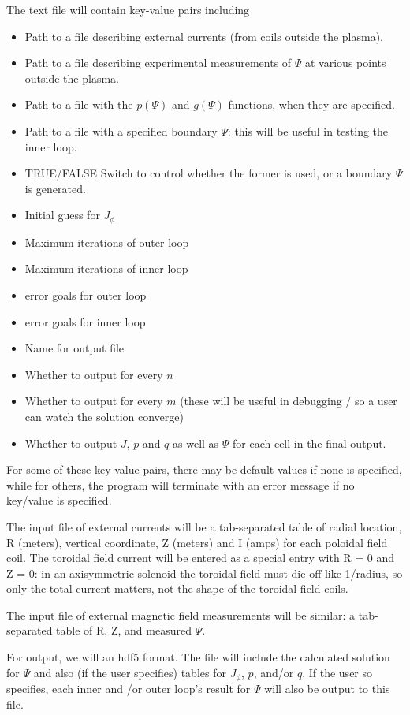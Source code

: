 \documentclass[paper=a4, fontsize=11pt]{scrartcl} %
\begin{document}
The text file will contain key-value pairs including
\begin{itemize}
\item Path to a file describing external currents (from coils outside the plasma).
\item Path to a file describing experimental measurements of $\Psi$ at various points outside the plasma.
\item Path to a file with the $p(\Psi)$ and $g(\Psi)$ functions, when they are specified.
\item Path to a file with a specified boundary $\Psi$: this will be useful in testing the inner loop.
\item TRUE/FALSE Switch to control whether the former is used, or a boundary $\Psi$ is generated.
\item Initial guess for $J_\phi$
\item Maximum iterations of outer loop
\item Maximum iterations of inner loop
\item error goals for outer loop
\item error goals for inner loop
\item Name for output file
\item Whether to output for every $n$
\item Whether to output for every $m$ (these will be useful in debugging / so a user can watch the solution converge)
\item Whether to output $J$, $p$ and $q$ as well as $\Psi$ for each cell in the final output.
\end{itemize}

For some of these key-value pairs, there may be default values if none is specified, while for others, the program will terminate with an error message if no key/value is specified.

The input file of external currents will be a tab-separated table of radial location, R (meters), vertical coordinate, Z (meters) and I (amps) for each poloidal field coil. The toroidal field current will be entered as a special entry with R = 0 and Z = 0: in an axisymmetric solenoid the toroidal field must die off like 1/radius, so only the total current matters, not the shape of the toroidal field coils.

The input file of external magnetic field measurements will be similar: a tab-separated table of R, Z, and measured $\Psi$.

For output, we will an hdf5 format. The file will include the calculated solution for $\Psi$ and also (if the user specifies) tables for $J_\phi$, $p$, and/or $q$. If the user so specifies, each inner and /or outer loop's result for $\Psi$ will also be output to this file.
\end{document}
